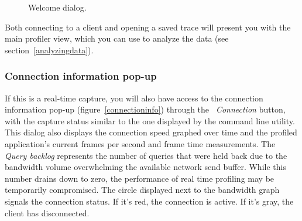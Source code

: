\documentclass[hidelinks,titlepage,a4paper]{article}
\begin{document}
\begin{figure}[h]
\centering{}
\caption{Welcome dialog.}
\label{welcomedialog}
\end{figure}

Both connecting to a client and opening a saved trace will present you with the main profiler view, which you can use to analyze the data (see section~\ref{analyzingdata}).

\subsubsection{Connection information pop-up}
\label{connectionpopup}

If this is a real-time capture, you will also have access to the connection information pop-up (figure~\ref{connectioninfo}) through the \emph{\faWifi{}~Connection} button, with the capture status similar to the one displayed by the command line utility. This dialog also displays the connection speed graphed over time and the profiled application's current frames per second and frame time measurements. The \emph{Query backlog} represents the number of queries that were held back due to the bandwidth volume overwhelming the available network send buffer. While this number drains down to zero, the performance of real time profiling may be temporarily compromised. The circle displayed next to the bandwidth graph signals the connection status. If it's red, the connection is active. If it's gray, the client has disconnected.
\end{document}
